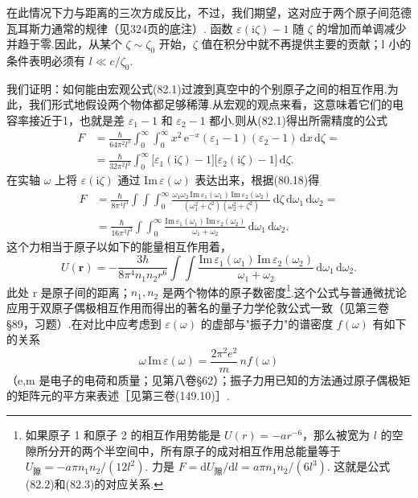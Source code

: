 在此情况下力与距离的三次方成反比，不过，我们期望，这对应于两个原子间范德瓦耳斯力通常的规律（见324页的底注）. 函数 $\varepsilon(\mathrm{i}\zeta)-1$ 随 $\zeta$ 的增加而单调减少并趋于零.因此，从某个 $\zeta\sim\zeta_0$ 开始，$\zeta$ 值在积分中就不再提供主要的贡献；l 小的条件表明必须有 $l\ll c/\zeta_0$.

我们证明：如何能由宏观公式(82.1)过渡到真空中的个别原子之间的相互作用.为此，我们形式地假设两个物体都足够稀薄.从宏观的观点来看，这意味着它们的电容率接近于1，也就是差 $\varepsilon_1-1$ 和 $\varepsilon_2-1$ 都小.则从(82.1)得出所需精度的公式
\begin{equation*}
  \begin{aligned}
    F&=\frac{\hbar}{64\pi^{2}l^{3}}\int_{0}^{\infty}\!\!\int_{0}^{\infty}x^{2}\,\mathrm{e}^{-x}(\varepsilon_1-1)(\varepsilon_2-1)\,\mathrm{d}x\,\mathrm{d}\zeta=\\
    &=\frac{\hbar}{32\pi^{2}l^{3}}\int_{0}^{\infty}\bigl[\varepsilon_1(\mathrm{i}\zeta)-1\bigr]\bigl[\varepsilon_2(\mathrm{i}\zeta)-1\bigr]\,\mathrm{d}\zeta.
  \end{aligned}
\end{equation*}
在实轴 $\omega$ 上将 $\varepsilon(\mathrm{i}\zeta)$ 通过 $\mathrm{Im}\,\varepsilon(\omega)$ 表达出来，根据(80.18)得
\begin{equation}
  \begin{aligned}
    F&=\frac{\hbar}{8\pi^{4}l^{3}}\int\!\!\!\int\!\!\!\int_{0}^{\infty}\frac{\omega_1\omega_2\,\mathrm{Im}\,\varepsilon_1(\omega_1)\,\mathrm{Im}\,\varepsilon_2(\omega_2)}{(\omega_1^{2}+\zeta^{2})(\omega_2^{2}+\zeta^{2})}\,\mathrm{d}\zeta\,\mathrm{d}\omega_1\,\mathrm{d}\omega_2=\\
    &=\frac{\hbar}{16\pi^{3}l^{3}}\int\!\!\!\int_{0}^{\infty}\frac{\mathrm{Im}\,\varepsilon_1(\omega_1)\,\mathrm{Im}\,\varepsilon_2(\omega_2)}{\omega_1+\omega_2}\,\mathrm{d}\omega_1\,\mathrm{d}\omega_2.
  \end{aligned}
\end{equation}
这个力相当于原子以如下的能量相互作用着，
\begin{equation}
  U(\bm{r})=-\frac{3\hbar}{8\pi^{4}n_1 n_2 r^{6}}\int\!\!\!\int\frac{\mathrm{Im}\,\varepsilon_1(\omega_1)\,\mathrm{Im}\,\varepsilon_2(\omega_2)}{\omega_1+\omega_2}\,\mathrm{d}\omega_1\,\mathrm{d}\omega_2.
\end{equation}
此处 r 是原子间的距离；$n_1,n_2$ 是两个物体的原子数密度\footnote{如果原子 1 和原子 2 的相互作用势能是 $U(r)=-ar^{-6}$，那么被宽为 $l$ 的空隙所分开的两个半空间中，所有原子的成对相互作用总能量等于 $U_{\text{隙}}=-a\pi n_1 n_2/(12l^{2})$. 力是 $F=\mathrm{d}U_{\text{隙}}/\mathrm{d}l=a\pi n_1 n_2/(6l^{3})$. 这就是公式(82.2)和(82.3)的对应关系.}.这个公式与普通微扰论应用于双原子偶极相互作用而得出的著名的量子力学伦敦公式一致（见第三卷§89，习题）.在对比中应考虑到 $\varepsilon(\omega)$ 的虚部与"振子力"的谱密度 $f(\omega)$ 有如下的关系
\begin{equation*}
  \omega\,\mathrm{Im}\,\varepsilon(\omega)=\frac{2\pi^{2}e^{2}}{m}\,n f(\omega)
\end{equation*}
（e,m 是电子的电荷和质量；见第八卷§62）；振子力用已知的方法通过原子偶极矩的矩阵元的平方来表述［见第三卷(149.10)］.

